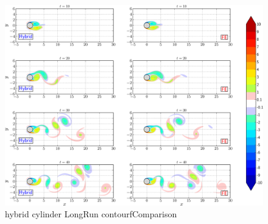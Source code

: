 	\begin{figure}[!p]
	\showthe\columnwidth
	\centering
	\includegraphics[width=\linewidth]{./figures/hybrid/isc/hybrid_cylinder_LongRun_contourfComparison_compressed-crop.png}
	\caption{hybrid cylinder LongRun contourfComparison}
	\label{fig:hybrid_cylinder_LongRun_contourfComparison}
	\end{figure}

